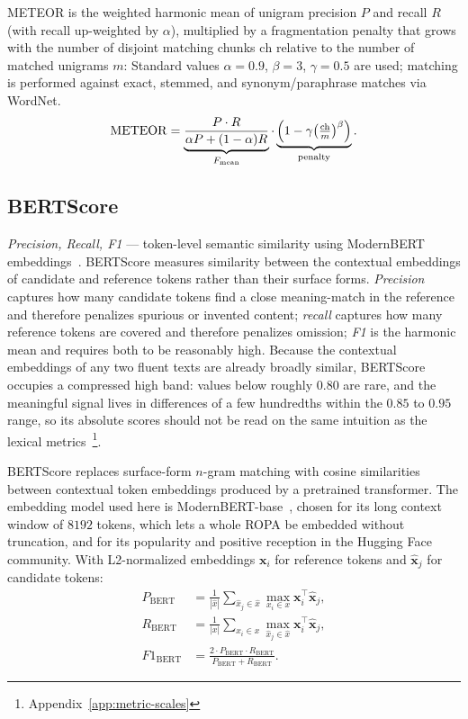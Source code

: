 METEOR is the weighted harmonic mean of unigram precision $P$ and recall $R$ (with recall up-weighted by $\alpha$), multiplied by a fragmentation penalty that grows with the number of disjoint matching chunks $\mathrm{ch}$ relative to the number of matched unigrams $m$:
Standard values $\alpha = 0.9$, $\beta = 3$, $\gamma = 0.5$ are used; matching is performed against exact, stemmed, and synonym/paraphrase matches via WordNet.
\begin{equation}
\label{eq:meteor}
\mathrm{METEOR} = \underbrace{\frac{P \cdot R}{\alpha P + (1 - \alpha) R}}_{F_{\mathrm{mean}}}
\cdot
\underbrace{\Bigl(1 - \gamma \bigl(\tfrac{\mathrm{ch}}{m}\bigr)^{\beta}\Bigr)}_{\text{penalty}}.
\end{equation}


\subsection{BERTScore}

\emph{Precision, Recall, F1} --- token-level semantic similarity using ModernBERT embeddings~\cite{Zhang2020}. BERTScore measures similarity between the contextual embeddings of candidate and reference tokens rather than their surface forms. \emph{Precision} captures how many candidate tokens find a close meaning-match in the reference and therefore penalizes spurious or invented content; \emph{recall} captures how many reference tokens are covered and therefore penalizes omission; \emph{F1} is the harmonic mean and requires both to be reasonably high. Because the contextual embeddings of any two fluent texts are already broadly similar, BERTScore occupies a compressed high band: values below roughly $0.80$ are rare, and the meaningful signal lives in differences of a few hundredths within the $0.85$ to $0.95$ range, so its absolute scores should not be read on the same intuition as the lexical metrics~\footnote{Appendix~\ref{app:metric-scales}}.

BERTScore replaces surface-form $n$-gram matching with cosine similarities between contextual token embeddings produced by a pretrained transformer.
The embedding model used here is ModernBERT-base~\cite{HFModernBERTBase,Warner2024}, chosen for its long context window of $8192$ tokens,
which lets a whole ROPA be embedded without truncation, and for its popularity and positive reception in the Hugging Face community.
With L2-normalized embeddings $\mathbf{x}_i$ for reference tokens and $\hat{\mathbf{x}}_j$ for candidate tokens:
\begin{align}
P_{\text{BERT}} &= \frac{1}{|\hat{x}|} \sum_{\hat{x}_j \in \hat{x}} \max_{x_i \in x} \mathbf{x}_i^{\top} \hat{\mathbf{x}}_j, \label{eq:bertscore-p} \\
R_{\text{BERT}} &= \frac{1}{|x|} \sum_{x_i \in x} \max_{\hat{x}_j \in \hat{x}} \mathbf{x}_i^{\top} \hat{\mathbf{x}}_j, \label{eq:bertscore-r} \\
F1_{\text{BERT}} &= \frac{2 \cdot P_{\text{BERT}} \cdot R_{\text{BERT}}}{P_{\text{BERT}} + R_{\text{BERT}}}. \label{eq:bertscore-f1}
\end{align}

